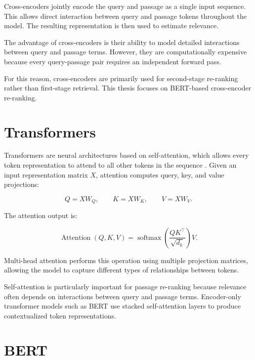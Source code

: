 Cross-encoders jointly encode the query and passage as a single input sequence. This allows direct interaction between query and passage tokens throughout the model. The resulting representation is then used to estimate relevance.

The advantage of cross-encoders is their ability to model detailed interactions between query and passage terms. However, they are computationally expensive because every query-passage pair requires an independent forward pass.

For this reason, cross-encoders are primarily used for second-stage re-ranking rather than first-stage retrieval. This thesis focuses on BERT-based cross-encoder re-ranking.

\section{Transformers}
\label{sec:background_transformers}

Transformers are neural architectures based on self-attention, which allows every token representation to attend to all other tokens in the sequence \cite{vaswani2017attention}. Given an input representation matrix $X$, attention computes query, key, and value projections:

\begin{equation}
    Q=XW_Q, \qquad K=XW_K, \qquad V=XW_V.
\end{equation}

The attention output is:

\begin{equation}
    \operatorname{Attention}(Q,K,V)
    =
    \operatorname{softmax}
    \left(
    \frac{QK^\top}{\sqrt{d_k}}
    \right)V.
\end{equation}

Multi-head attention performs this operation using multiple projection matrices, allowing the model to capture different types of relationships between tokens.

Self-attention is particularly important for passage re-ranking because relevance often depends on interactions between query and passage terms. Encoder-only transformer models such as BERT use stacked self-attention layers to produce contextualized token representations.

\section{BERT}
\label{sec:background_bert}

